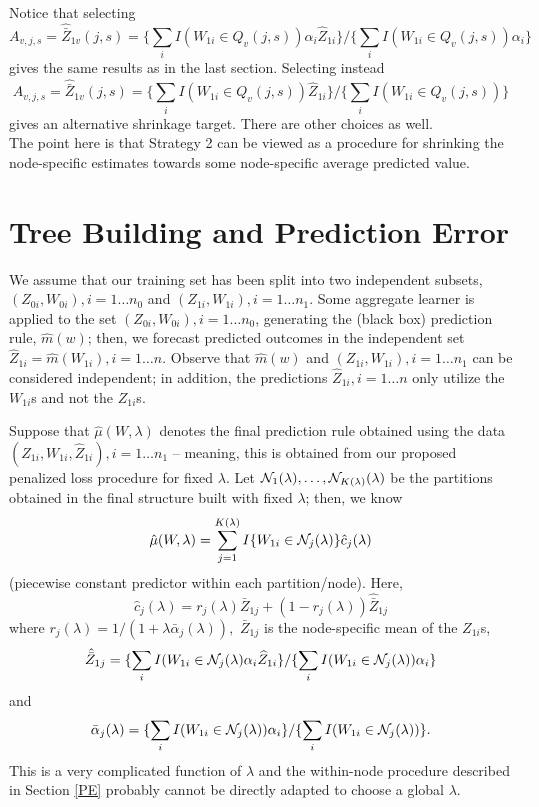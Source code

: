 \documentclass[12pt]{article}
\begin{document}
Notice that selecting
\[
A_{v,j,s} = \hat{\bar{Z}}_{1v}(j,s) =
\{ \sum_i I(W_{1i} \in Q_{v}(j,s)) \alpha_i  \hat{Z}_{1i} \}
/ \{ \sum_i I(W_{1i} \in Q_{v}(j,s)) \alpha_i \}
\]
gives the same results as in the last section. Selecting instead
\[
A_{v,j,s} = \hat{\bar{Z}}_{1v}(j,s) =
\{ \sum_i I(W_{1i} \in Q_{v}(j,s))  \hat{Z}_{1i} \}
/ \{ \sum_i I(W_{1i} \in Q_{v}(j,s))  \}
\]
gives an alternative shrinkage target.  There are other choices as well.\\

The point here is that Strategy 2 can be viewed as a procedure for shrinking the node-specific estimates towards some node-specific average predicted value.

\section{Tree Building and Prediction Error}
\label{PE-tree}

We assume that our training set has been split into two independent subsets,
$(Z_{0i},W_{0i}), i = 1 \ldots n_0$ and $(Z_{1i}, W_{1i}), i = 1
\ldots n_1$. Some aggregate learner is applied to 
the set $(Z_{0i}, W_{0i}), i = 1 \ldots
n_0$, generating the (black box) prediction rule, $\hat{m}(w)$; then,
we forecast predicted outcomes in the independent set $\widehat{Z}_{1i} =
\hat{m}(W_{1i}), i = 1 \ldots n$.  Observe that $\hat{m}(w)$ and
$(Z_{1i}, W_{1i}), i = 1 \ldots n_1$ can be considered independent; in
addition, the predictions $\widehat{Z}_{1i}, i = 1 \ldots n$ only
utilize the $W_{1i}$s and not the $Z_{1i}$s. 

Suppose that $\hat{\mu}(W,\lambda)$ denotes the final prediction
rule obtained using the data $(Z_{1i}, W_{1i}, \hat Z_{1i}), i = 1
\ldots n_1$ -- meaning, this is obtained from our proposed
penalized loss procedure for fixed $\lambda.$
Let ${\cal N}_1(\lambda), \ldots, {\cal N}_{K(\lambda)}(\lambda)$ be the
partitions obtained in the final structure built with fixed $\lambda$; 
then, we know
\[
\hat{\mu}(W,\lambda) = \sum_{j=1}^{K(\lambda)} I\{W_{1i} \in {\cal N}_j(\lambda)\} \hat c_j(\lambda)
\]
(piecewise constant predictor within each partition/node).  Here,
 \[
\hat{c}_{j}(\lambda) =
r_{j}(\lambda) \bar{Z}_{1j} + (1-r_j(\lambda)) \hat{\bar{Z}}_{1j}
\]
where $r_j(\lambda) = 1/(1 + \lambda \bar{\alpha}_j(\lambda)),$ 
$\bar{Z}_{1j}$ is the node-specific mean
of the $Z_{1i}$s,
\[
\hat{\bar{Z}}_{1j}=
\{ \sum_i I(W_{1i} \in {\cal N}_j(\lambda) \alpha_i  \widehat{Z}_{1i}  \}
/ \{ \sum_i I(W_{1i} \in {\cal N}_j(\lambda)) \alpha_i \}
\]
and
\[
\bar{\alpha}_{j}(\lambda) =  \{ \sum_i I(W_{1i} \in  {\cal N}_j(\lambda)) \alpha_i \} /
\{ \sum_i I(W_{1i} \in  {\cal N}_j(\lambda))  \}. 
\]
This is a very complicated function of $\lambda$ and the within-node procedure described in Section \ref{PE} probably cannot be directly adapted to choose a
global  $\lambda$.
\end{document}
